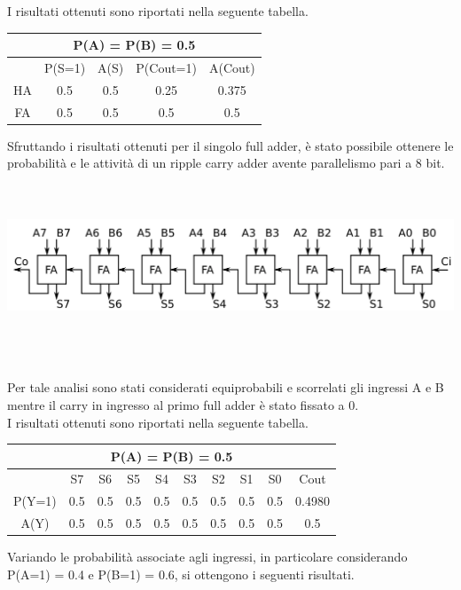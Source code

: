\documentclass[11pt,  english, makeidx, a4paper, titlepage, oneside]{book}
\begin{document}
I risultati ottenuti sono riportati nella seguente tabella.
\vspace{0.3cm}
\begin{center}
	\begin{tabular}{|c|c|c|c|c|}
	\hline
	\multicolumn{5}{|c|}{P(A) = P(B) = 0.5  }\\
	\hline
	  & P(S=1) & A(S) & P(Cout=1) & A(Cout) \\ 
	\hline
	HA & 0.5 & 0.5 & 0.25 & 0.375 \\
	\hline
	FA & 0.5 & 0.5 & 0.5 & 0.5 \\
	\hline
	\end{tabular}
\end{center}
\vspace{0.3cm}
Sfruttando i risultati ottenuti per il singolo full adder, è stato possibile ottenere le probabilità e le attività di un ripple carry adder avente parallelismo pari a 8 bit.
\\\\\\
\centerline{\includegraphics[width=15cm]{./img/Lab_1/Es_2/RCA_8_bit.png}}
\\\\\\
Per tale analisi sono stati considerati equiprobabili e scorrelati gli ingressi A e B mentre il carry in ingresso al primo full adder è stato fissato a 0.\\
I risultati ottenuti sono riportati nella seguente tabella.
\vspace{0.3cm}
\begin{center}
\begin{tabular}{|c|c|c|c|c|c|c|c|c|c|}
\hline
\multicolumn{10}{|c|}{P(A) = P(B) = 0.5}\\
\hline
 & S7 & S6 & S5 & S4 & S3 & S2 & S1 & S0 & Cout \\
\hline
P(Y=1) & 0.5 & 0.5 & 0.5 & 0.5 & 0.5 & 0.5 & 0.5 & 0.5 & 0.4980 \\
\hline
A(Y) & 0.5 & 0.5 & 0.5 & 0.5 & 0.5 & 0.5 & 0.5 & 0.5 & 0.5 \\
\hline
\end{tabular}
\end{center}
\vspace{0.3cm}
Variando le probabilità associate agli ingressi, in particolare considerando P(A=1) = 0.4 e P(B=1) = 0.6, si ottengono i seguenti risultati.
\end{document}
